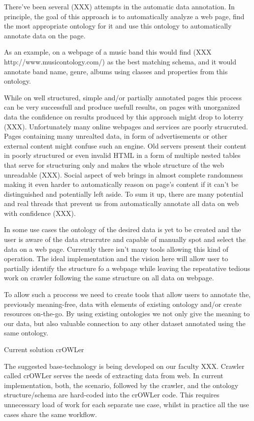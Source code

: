 There've been several (XXX) attempts in the automatic data annotation. In
principle, the goal of this approach is to automatically analyze a web page,
find the most appropriate ontology for it and use this ontology to
automatically annotate data on the page. 

As an example, on a webpage of a music band this would find (XXX
http://www.musicontology.com/) as the best matching schema, and it would
annotate band name, genre, albums using classes and  properties from this ontology. 

While on well structured, simple and/or partially annotated pages this process
can be very successfull and produce usefull results, on pages with unorganized
data the confidence on results produced by this approach might drop to loterry (XXX). 
Unfortunately many online webpages and services are poorly strucruted. Pages
containing many unrealted data, in form of advertisements or other external
content might confuse such an engine. Old servers present their content in
poorly structured or even invalid HTML in a form of multiple nested tables that
serve for structuring only and makes the whole structure of the web unreadable
(XXX). Social aspect of web brings in almost complete randomness making it
even harder to automatically reason on page's content if it can't be
distinguished and potentially left aside. To sum it up, there are many
potential and real threads that prevent us from automatically annotate all data
on web with confidence (XXX). 

In some use cases the ontology of the desired data is yet to be created and the
user is aware of the data strucrutre and capable of manually spot and select
the data on a web page. Currently there isn't many tools allowing this kind of
operation. The ideal implementation and the vision here will allow user to
partially identify the structure fo a webpage while leaving the repeatative
tedious work on crawler following the same structure on all data on webpage. 

To allow such a proccess we need to create tools that allow users to annotate
the, previously meaning-free, data with elements of existing ontology and/or
create resources on-the-go. By using existing ontologies we not only give the
meaning to our data, but also valuable connection to any other dataset
annotated using the same ontology. 


\sec Current solution crOWLer

The suggested base-technology is being developed on our faculty XXX. Crawler
called crOWLer serves the needs of extracting data from web. In current
implementation, both, the scenario, followed by the crawler, and the ontology
structure/schema are hard-coded into the crOWLer code. This requires
unnecessary load of work for each separate use case, whilst in practice all the
use cases share the same workflow. 

